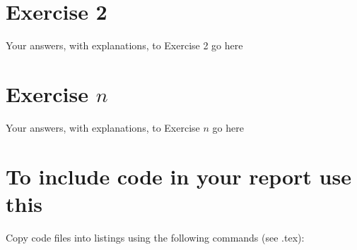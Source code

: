 \documentclass{article}
\begin{document}
\begin{enumerate}[1.]
\begin{tikzpicture}
\end{tikzpicture}

\end{enumerate}



\section*{Exercise 2}

Your answers, with explanations, to Exercise 2 go here

\section*{Exercise $n$}

Your answers, with explanations, to Exercise $n$ go here


\section*{To include code in your report use this}

Copy code files into listings using the following commands (see .tex):
\end{document}
